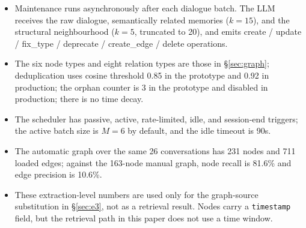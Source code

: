 \documentclass[11pt]{article}
\begin{document}
\begin{itemize}
  \item Maintenance runs asynchronously after each dialogue batch. The LLM receives the raw
        dialogue, semantically related memories ($k=15$), and the structural neighbourhood
        ($k=5$, truncated to 20), and emits create / update / fix\_type / deprecate /
        create\_edge / delete operations.
  \item The six node types and eight relation types are those in \S\ref{sec:graph}; deduplication
        uses cosine threshold 0.85 in the prototype and 0.92 in production; the orphan counter is
        3 in the prototype and disabled in production; there is no time decay.
  \item The scheduler has passive, active, rate-limited, idle, and session-end triggers; the active
        batch size is $M=6$ by default, and the idle timeout is 90s.
  \item The automatic graph over the same 26 conversations has 231 nodes and 711 loaded edges;
        against the 163-node manual graph, node recall is 81.6\% and edge precision is 10.6\%.
  \item These extraction-level numbers are used only for the graph-source substitution in
        \S\ref{sec:e3}, not as a retrieval result. Nodes carry a \texttt{timestamp} field, but the
        retrieval path in this paper does not use a time window.
\end{itemize}


\end{document}
